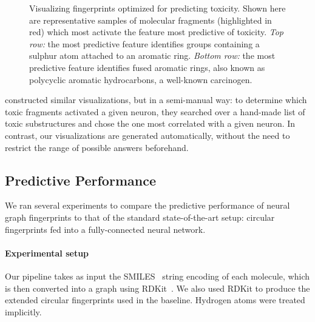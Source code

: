 \documentclass{article}
\newcommand{\citep}{\cite}
\newcommand{\citet}{\cite}
\begin{document}
\begin{figure}[h]
\begin{tabular}{>{\centering}m{1in} >{\centering}m{3.1cm} >{\centering}m{3.3cm} >{\centering\arraybackslash}m{3.1cm}}
\end{tabular}
\vspace{-3mm}
\caption{Visualizing fingerprints optimized for predicting toxicity.
Shown here are representative samples of molecular fragments (highlighted in red) which most activate the feature most predictive of toxicity.
\emph{Top row:} the most predictive feature identifies groups containing a sulphur atom attached to an aromatic ring.
\emph{Bottom row:} the most predictive feature identifies fused aromatic rings, also known as polycyclic aromatic hydrocarbons, a well-known carcinogen.
}
\label{fig:learned features toxicity}
\end{figure}

\citet{unterthiner2015toxicity} constructed similar visualizations, but in a semi-manual way: to determine which toxic fragments activated a given neuron, they searched over a hand-made list of toxic substructures and chose the one most correlated with a given neuron.
In contrast, our visualizations are generated automatically, without the need to restrict the range of possible answers beforehand.

\subsection{Predictive Performance}

We ran several experiments to compare the predictive performance of neural graph fingerprints to that of the standard state-of-the-art setup: circular fingerprints fed into a fully-connected neural network.

\paragraph{Experimental setup}
Our pipeline takes as input the SMILES~\citep{weininger1988smiles} string encoding of each molecule, which is then converted into a graph using RDKit~\citep{rdkit}.
We also used RDKit to produce the extended circular fingerprints used in the baseline.
Hydrogen atoms were treated implicitly.
\end{document}
